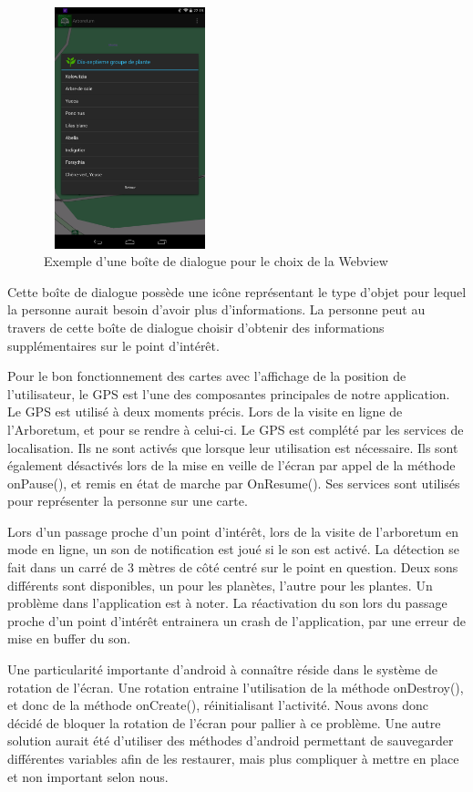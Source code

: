 \documentclass[a4paper,11pt]{article}
\begin{document}
			\begin{figure}[H]
     \begin{center}
      \includegraphics[width=5cm,height=7cm]{menuchoix.png}
      \caption{Exemple d'une boîte de dialogue pour le choix de la Webview}
     \end{center}
    \end{figure}
			Cette boîte de dialogue possède une icône représentant le type d'objet pour lequel la personne aurait besoin d'avoir plus d'informations. La personne peut au travers de cette boîte de dialogue choisir d'obtenir des informations supplémentaires sur le point d'intérêt.
		
		Pour le bon fonctionnement des cartes avec l’affichage de la position de l'utilisateur, le GPS est l'une des composantes principales de notre application. Le GPS est utilisé à deux moments précis. Lors de la visite en ligne de l'Arboretum, et pour se rendre à celui-ci. Le GPS est complété par les services de localisation. Ils ne sont activés que lorsque leur utilisation est nécessaire. Ils sont également désactivés lors de la mise en veille de l'écran par appel de la méthode onPause(), et remis en état de marche par OnResume(). Ses services sont utilisés pour représenter la personne sur une carte.
		
		Lors d'un passage proche d'un point d'intérêt, lors de la visite de l'arboretum en mode en ligne, un son de notification est joué si le son est activé. La détection se fait dans un carré de 3 mètres de côté centré sur le point en question. Deux sons différents sont disponibles, un pour les planètes, l'autre pour les plantes. Un problème dans l'application est à noter. La réactivation du son lors du passage proche d'un point d'intérêt entrainera un crash de l'application, par une erreur de mise en buffer du son.
		
		Une particularité importante d'android à connaître réside dans le système de rotation de l'écran. Une rotation entraine l'utilisation de la méthode onDestroy(), et donc de la méthode onCreate(), réinitialisant l'activité. Nous avons donc décidé de bloquer la rotation de l'écran pour pallier à ce problème. Une autre solution aurait été d'utiliser des méthodes d'android permettant de sauvegarder différentes variables afin de les restaurer, mais plus compliquer à mettre en place et non important selon nous.
		
\end{document}

